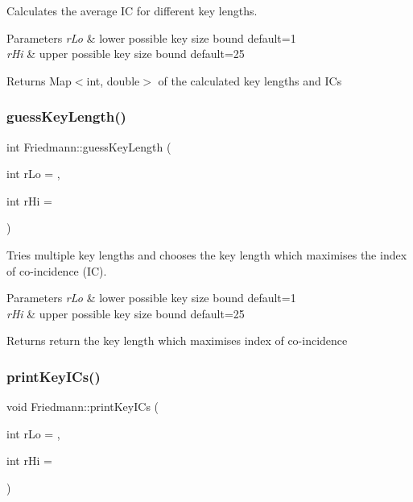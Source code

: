 Calculates the average IC for different key lengths.


\begin{DoxyParams}{Parameters}
{\em r\+Lo} & lower possible key size bound default=1 \\
\hline
{\em r\+Hi} & upper possible key size bound default=25 \\
\hline
\end{DoxyParams}
\begin{DoxyReturn}{Returns}
Map$<$int, double$>$ of the calculated key lengths and I\+Cs 
\end{DoxyReturn}
\mbox{\label{classFriedmann_a4b63925a80957b0263c78cfcd91fb362}} 
\subsubsection{\texorpdfstring{guess\+Key\+Length()}{guessKeyLength()}}
{\footnotesize\ttfamily int Friedmann\+::guess\+Key\+Length (\begin{DoxyParamCaption}\item[{int}]{r\+Lo = {},  }\item[{int}]{r\+Hi = {} }\end{DoxyParamCaption})}

Tries multiple key lengths and chooses the key length which maximises the index of co-\/incidence (IC).


\begin{DoxyParams}{Parameters}
{\em r\+Lo} & lower possible key size bound default=1 \\
\hline
{\em r\+Hi} & upper possible key size bound default=25 \\
\hline
\end{DoxyParams}
\begin{DoxyReturn}{Returns}
return the key length which maximises index of co-\/incidence 
\end{DoxyReturn}
\mbox{\label{classFriedmann_ad03460df53d45df8c937703ce02af949}} 
\subsubsection{\texorpdfstring{print\+Key\+I\+Cs()}{printKeyICs()}}
{\footnotesize\ttfamily void Friedmann\+::print\+Key\+I\+Cs (\begin{DoxyParamCaption}\item[{int}]{r\+Lo = {},  }\item[{int}]{r\+Hi = {} }\end{DoxyParamCaption})}

